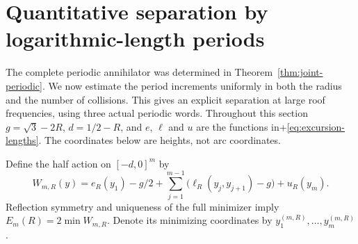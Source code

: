 \section{Quantitative separation by logarithmic-length periods}
\label{sec:quantitative-periods}
The complete periodic annihilator was determined in
Theorem~\ref{thm:joint-periodic}. We now estimate the period increments
uniformly in both the radius and the number of collisions. This gives an
explicit separation at large roof frequencies, using three actual
periodic words. Throughout this section $g=\sqrt3-2R$, $d=1/2-R$,
and $e$, $\ell$ and $u$ are the functions in+\eqref{eq:excursion-lengths}. The coordinates below are heights, not
arc coordinates.

Define the half action on $[-d,0]^m$ by
\begin{equation}\label{eq:half-action-v4}
 W_{m,R}(y)=e_R(y_1)-g/2+
       \sum_{j=1}^{m-1}\bigl(\ell_R(y_j,y_{j+1})-g\bigr)+u_R(y_m).
\end{equation}
Reflection symmetry and uniqueness of the full minimizer imply
$E_m(R)=2\min W_{m,R}$. Denote its minimizing coordinates by
$y^{(m,R)}_1,\ldots,y^{(m,R)}_m$.

